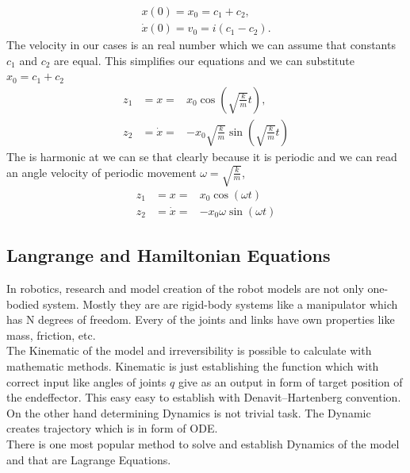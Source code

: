 \begin{eqnarray}
x(0)=x_0 = c_1 + c_2,\\
\dot{x}(0)=v_0 = i(c_1-c_2).
\end{eqnarray}
The velocity in our cases is an real number which we can assume that constants $c_1$ and $c_2$ are equal. 
This simplifies our equations  and we can substitute $x_0 = c_1 +c_2$
\begin{eqnarray}
	z_1 &= x =& x_0\cos\left(\sqrt{\frac{k}{m}}t\right),\\
	z_2 &= \dot{x} =& -x_0\sqrt{\frac{k}{m}}\sin\left(\sqrt{\frac{k}{m}}t\right)
\end{eqnarray}
The is harmonic at we can se that clearly because it is periodic and we can read an angle velocity of periodic movement $\omega = \sqrt{\frac{k}{m}}$,
\begin{eqnarray}
	z_1 &= x =& x_0\cos\left(\omega t\right)\\
	z_2 &= \dot{x} =& -x_0\omega\sin\left(\omega t\right)
\end{eqnarray}
\subsection{Langrange and Hamiltonian Equations}
In robotics, research and model creation of the robot models are not only one-bodied system. Mostly they are are rigid-body systems like a manipulator which has N degrees of freedom. Every of the joints and links have own properties like mass, friction, etc.\\
The Kinematic of the model and irreversibility is possible to calculate with mathematic methods. Kinematic is just establishing the function which with correct input like angles of joints $q$ give as an output in form of target position of the endeffector. This easy easy to establish with Denavit–Hartenberg convention.  On the other hand determining Dynamics is not trivial task. The Dynamic creates trajectory which is in form of ODE.\\
There is one most popular method to solve and establish Dynamics of the model and that are Lagrange Equations.
